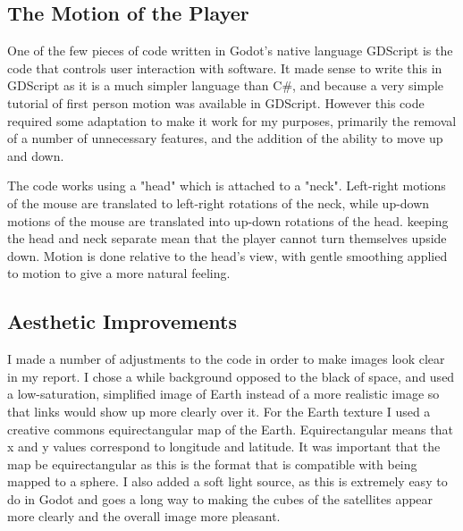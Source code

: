 \documentclass[12pt,a4paper,twoside,openright]{report}
\begin{document}
\subsection{The Motion of the Player}

One of the few pieces of code written in Godot's native language GDScript is the code that controls user interaction with software. It made sense to write this in GDScript as it is a much simpler language than C\#, and because a very simple tutorial of first person motion was available in GDScript\cite{FirstPersonMotion}. However this code required some adaptation to make it work for my purposes, primarily the removal of a number of unnecessary features, and the addition of the ability to move up and down.

The code works using a "head" which is attached to a "neck". Left-right motions of the mouse are translated to left-right rotations of the neck, while up-down motions of the mouse are translated into up-down rotations of the head. keeping the head and neck separate mean that the player cannot turn themselves upside down. Motion is done relative to the head's view, with gentle smoothing applied to motion to give a more natural feeling.

\subsection{Aesthetic Improvements}
I made a number of adjustments to the code in order to make images look clear in my report. I chose a while background opposed to the black of space, and used a low-saturation, simplified image of Earth instead of a more realistic image so that links would show up more clearly over it. For the Earth texture I used a creative commons equirectangular map of the Earth. Equirectangular means that x and y values correspond to longitude and latitude. It was important that the map be equirectangular as this is the format that is compatible with being mapped to a sphere. \cite{Map} I also added a soft light source, as this is extremely easy to do in Godot and goes a long way to making the cubes of the satellites appear more clearly and the overall image more pleasant.
\end{document}
